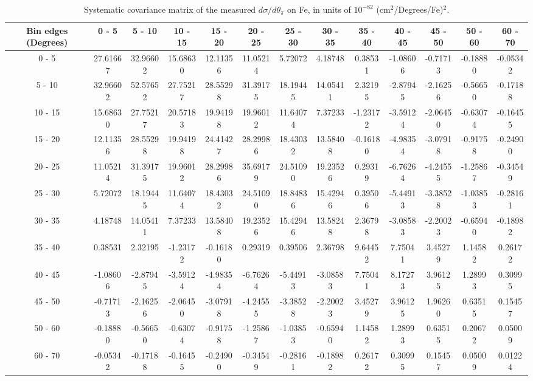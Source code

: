 \documentclass[aps,prl,twocolumn,superscriptaddress,nofootinbib]{revtex4-1}
\begin{document}
\begin{turnpage}
 \begin{table}[h!]
  \centering
  \caption{Systematic covariance matrix of the measured $d\sigma/d\theta_{\pi}$ on Fe, in units of $10^{-82}$ (cm$^{2}$/Degrees/Fe)$^{2}$.}
    \begin{tabular}{c||cccccccccccc}
      Bin edges (Degrees) & 0 - 5 & 5 - 10 & 10 - 15 & 15 - 20 & 20 - 25 & 25 - 30 & 30 - 35 & 35 - 40 & 40 - 45 & 45 - 50 & 50 - 60 & 60 - 70 \\
\hline \hline
        0 - 5 & 27.61667 & 32.96602 & 15.68630 & 12.11356 & 11.05214 &  5.72072 &  4.18748 &  0.38531 & -1.08606 & -0.71713 & -0.18880 & -0.05342 \\
       5 - 10 & 32.96602 & 52.57652 & 27.75217 & 28.55298 & 31.39175 & 18.19445 & 14.05411 &  2.32195 & -2.87945 & -2.16256 & -0.56650 & -0.17188 \\
      10 - 15 & 15.68630 & 27.75217 & 20.57183 & 19.94198 & 19.96012 & 11.64074 &  7.37233 & -1.23172 & -3.59124 & -2.06450 & -0.63074 & -0.16455 \\
      15 - 20 & 12.11356 & 28.55298 & 19.94198 & 24.41427 & 28.29986 & 18.43032 & 13.58408 & -0.16180 & -4.98354 & -3.07918 & -0.91758 & -0.24900 \\
      20 - 25 & 11.05214 & 31.39175 & 19.96012 & 28.29986 & 35.69179 & 24.51090 & 19.23526 &  0.29319 & -6.76264 & -4.24555 & -1.25867 & -0.34549 \\
      25 - 30 &  5.72072 & 18.19445 & 11.64074 & 18.43032 & 24.51090 & 18.84836 & 15.42946 &  0.39506 & -5.44913 & -3.38528 & -1.03853 & -0.28161 \\
      30 - 35 &  4.18748 & 14.05411 &  7.37233 & 13.58408 & 19.23526 & 15.42946 & 13.58248 &  2.36798 & -3.08583 & -2.20023 & -0.65940 & -0.18982 \\
      35 - 40 &  0.38531 &  2.32195 & -1.23172 & -0.16180 &  0.29319 &  0.39506 &  2.36798 &  9.64452 &  7.75041 &  3.45279 &  1.14582 &  0.26172 \\
      40 - 45 & -1.08606 & -2.87945 & -3.59124 & -4.98354 & -6.76264 & -5.44913 & -3.08583 &  7.75041 &  8.17273 &  3.96125 &  1.28993 &  0.30995 \\
      45 - 50 & -0.71713 & -2.16256 & -2.06450 & -3.07918 & -4.24555 & -3.38528 & -2.20023 &  3.45279 &  3.96125 &  1.96260 &  0.63515 &  0.15457 \\
      50 - 60 & -0.18880 & -0.56650 & -0.63074 & -0.91758 & -1.25867 & -1.03853 & -0.65940 &  1.14582 &  1.28993 &  0.63515 &  0.20672 &  0.05009 \\
      60 - 70 & -0.05342 & -0.17188 & -0.16455 & -0.24900 & -0.34549 & -0.28161 & -0.18982 &  0.26172 &  0.30995 &  0.15457 &  0.05009 &  0.01224 \\
    \end{tabular}
  \label{tablecov:Fe_Systematic_ThetaPi}
  \end{table}
\end{turnpage}
\end{document}
